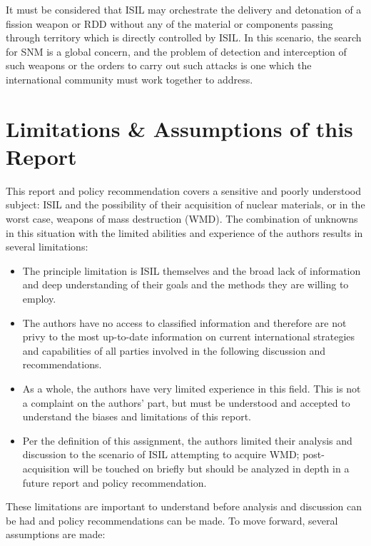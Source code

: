 \documentclass{report}
\begin{document}
It must be considered that ISIL may orchestrate the delivery and detonation of a fission weapon or RDD without any of the material or components passing through territory which is directly controlled by ISIL. In this scenario, the search for SNM is a global concern, and the problem of detection and interception of such weapons or the orders to carry out such attacks is one which the international community must work together to address. 



\section{Limitations \& Assumptions of this Report}


This report and policy recommendation covers a sensitive and poorly understood subject: ISIL and the possibility of their acquisition of nuclear materials, or in the worst case, weapons of mass destruction (WMD). The combination of unknowns in this situation with the limited abilities and experience of the authors results in several limitations:

\begin{itemize}
  \item The principle limitation is ISIL themselves and the broad lack of information and deep understanding of their goals and the methods they are willing to employ.
  \item The authors have no access to classified information and therefore are not privy to the most up-to-date information on current international strategies and capabilities of all parties involved in the following discussion and recommendations.
  \item As a whole, the authors have very limited experience in this field. This is not a complaint on the authors' part, but must be understood and accepted to understand the biases and limitations of this report.
  \item Per the definition of this assignment, the authors  limited  their analysis and discussion to the scenario of ISIL attempting to acquire WMD; post-acquisition will be touched on briefly but should be analyzed in depth in a future report and policy recommendation.
\end{itemize}


These limitations are important to understand before analysis and discussion can be had and policy recommendations can be made. To move forward, several assumptions are made:
\end{document}
